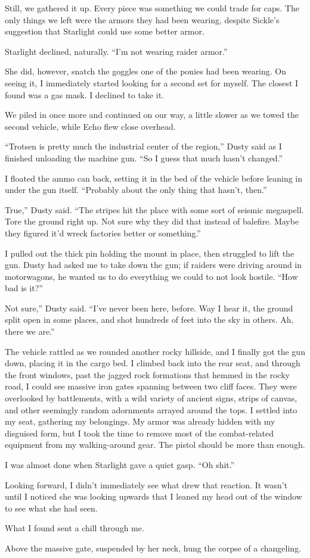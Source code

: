 Still, we gathered it up. Every piece was something we could trade for caps. The only things we left were the armors they had been wearing, despite Sickle’s suggestion that Starlight could use some better armor.

Starlight declined, naturally. “I’m not wearing raider armor.”

She did, however, snatch the goggles one of the ponies had been wearing. On seeing it, I immediately started looking for a second set for myself. The closest I found was a gas mask. I declined to take it.

We piled in once more and continued on our way, a little slower as we towed the second vehicle, while Echo flew close overhead.

{\br}%
“Trotsen is pretty much the industrial center of the region,” Dusty said as I finished unloading the machine gun. “So I guess that much hasn’t changed.”

I floated the ammo can back, setting it in the bed of the vehicle before leaning in under the gun itself. “Probably about the only thing that hasn’t, then.”

\leavevmode{}True,” Dusty said. “The stripes hit the place with some sort of seismic megaspell. Tore the ground right up. Not sure why they did that instead of balefire. Maybe they figured it’d wreck factories better or something.”

I pulled out the thick pin holding the mount in place, then struggled to lift the gun. Dusty had asked me to take down the gun; if raiders were driving around in motorwagons, he wanted us to do everything we could to not look hostile. “How bad is it?”

\leavevmode{}Not sure,” Dusty said. “I’ve never been here, before. Way I hear it, the ground split open in some places, and shot hundreds of feet into the sky in others. Ah, there we are.”

The vehicle rattled as we rounded another rocky hillside, and I finally got the gun down, placing it in the cargo bed. I climbed back into the rear seat, and through the front windows, past the jagged rock formations that hemmed in the rocky road, I could see massive iron gates spanning between two cliff faces. They were overlooked by battlements, with a wild variety of ancient signs, strips of canvas, and other seemingly random adornments arrayed around the tops.
I settled into my seat, gathering my belongings. My armor was already hidden with my disguised form, but I took the time to remove most of the combat-related equipment from my walking-around gear. The pistol should be more than enough.

I was almost done when Starlight gave a quiet gasp. “Oh shit.”

Looking forward, I didn’t immediately see what drew that reaction. It wasn’t until I noticed she was looking upwards that I leaned my head out of the window to see what she had seen.

What I found sent a chill through me.

Above the massive gate, suspended by her neck, hung the corpse of a changeling.